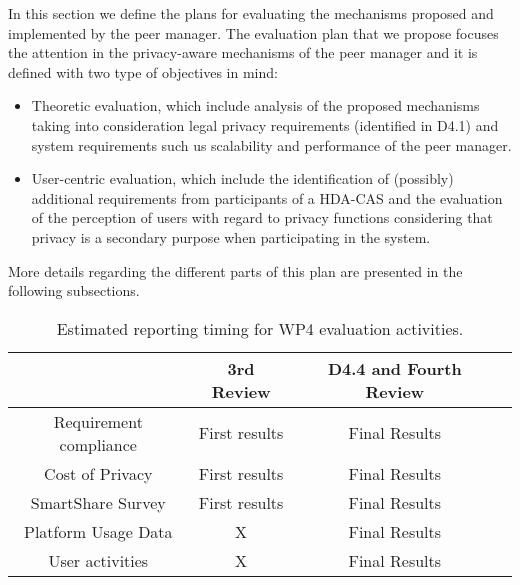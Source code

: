 
  
  


In this section we define the plans for evaluating the mechanisms proposed and implemented by the peer manager.
The evaluation plan that we propose focuses the attention in the privacy-aware mechanisms of the peer manager and it is defined with two type of objectives in mind:
\begin{itemize}
\item Theoretic evaluation, which include analysis of the proposed mechanisms taking into consideration legal privacy requirements (identified in D4.1) and system requirements such us scalability and performance of the peer manager.
\item User-centric evaluation, which include the identification of (possibly) additional requirements from participants of a HDA-CAS and the evaluation of the perception of users with regard to privacy functions considering that privacy is a secondary purpose when participating in the system.
\end{itemize}
More details regarding the different parts of this plan are presented in the following subsections.

\begin{table}
\begin{center}
\begin{tabular}{| c | c | c | c |}
  \hline                       
   & 3rd Review & D4.4 and Fourth Review\\  
  \hline                       
  Requirement compliance & First results & Final Results \\
  \hline          
  Cost of Privacy & First results & Final Results \\
  \hline
  SmartShare Survey & First results & Final Results \\
  \hline
  Platform Usage Data & X & Final Results \\
  \hline  
  User activities & X & Final Results\\
  \hline
\end{tabular}
\end{center}
\caption{Estimated reporting timing for WP4 evaluation activities.\label{t-validation-delivery}}
\end{table}


